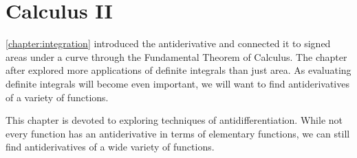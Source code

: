 \part{Calculus II}




\autoref{chapter:integration} introduced the antiderivative and connected it to signed areas under a curve through the Fundamental Theorem of Calculus. The chapter after explored more applications of definite integrals than just area. As evaluating definite integrals will become even important, we will want to find antiderivatives of a variety of functions.

This chapter is devoted to exploring techniques of antidifferentiation. While not every function has an antiderivative in terms of elementary functions,
we can still find antiderivatives of a wide variety of functions.



















%




